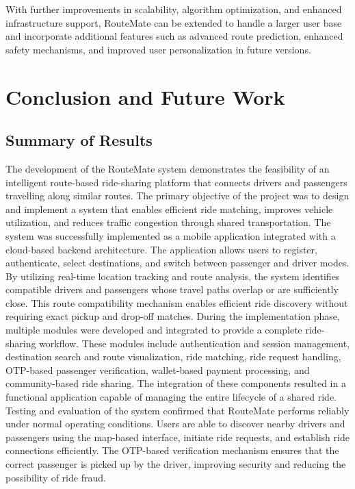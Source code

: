 \documentclass[10pt,a4paper]{report}
\begin{document}
\justify\large With further improvements in scalability, algorithm optimization, and enhanced infrastructure support, RouteMate can be extended to handle a larger user base and incorporate additional features such as advanced route prediction, enhanced safety mechanisms, and improved user personalization in future versions.


\newpage

\chapter{Conclusion and Future Work}

\section{Summary of Results}
\justify\large The development of the RouteMate system demonstrates the feasibility of an intelligent route-based ride-sharing platform that connects drivers and passengers travelling along similar routes. The primary objective of the project was to design and implement a system that enables efficient ride matching, improves vehicle utilization, and reduces traffic congestion through shared transportation.
\justify\large The system was successfully implemented as a mobile application integrated with a cloud-based backend architecture. The application allows users to register, authenticate, select destinations, and switch between passenger and driver modes. By utilizing real-time location tracking and route analysis, the system identifies compatible drivers and passengers whose travel paths overlap or are sufficiently close. This route compatibility mechanism enables efficient ride discovery without requiring exact pickup and drop-off matches.
\justify\large During the implementation phase, multiple modules were developed and integrated to provide a complete ride-sharing workflow. These modules include authentication and session management, destination search and route visualization, ride matching, ride request handling, OTP-based passenger verification, wallet-based payment processing, and community-based ride sharing. The integration of these components resulted in a functional application capable of managing the entire lifecycle of a shared ride.
\justify\large Testing and evaluation of the system confirmed that RouteMate performs reliably under normal operating conditions. Users are able to discover nearby drivers and passengers using the map-based interface, initiate ride requests, and establish ride connections efficiently. The OTP-based verification mechanism ensures that the correct passenger is picked up by the driver, improving security and reducing the possibility of ride fraud.
\end{document}
